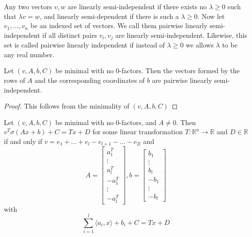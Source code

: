 \documentclass[11pt,letterpaper]{amsart}
\begin{document}
\begin{defin}\label{def:semilinindep}
    Any two vectors $v, w$ are linearly semi-independent if there exists no $\lambda\geq 0$ such that $\lambda v = w$, and linearly semi-dependent if there is such a $\lambda\geq 0$. Now let $v_1, \ldots, v_n$ be an indexed set of vectors. We call them pairwise linearly semi-independent if all distinct pairs $v_i, v_j$ are linearly semi-independent. Likewise, this set is called pairwise linearly independent if instead of $\lambda\geq 0$ we allows $\lambda$ to be any real number. 
\end{defin}
\begin{lemma}
    Let $(v, A, b, C)$ be minimal with no $0$-factors. Then the vectors formed by the rows of $A$ and the corresponding coordinates of $b$ are pairwise linearly semi-independent. 
\end{lemma}
\begin{proof}
    This follows from the minimality of $(v, A, b, C)$
\end{proof}
\begin{proposition}\label{thm:nontrivialzeroparam}
    Let $(v, A, b, C)$ be minimal with no $0$-factors, and $A\neq 0$. Then $v^T\sigma (Ax+b) + C = Tx + D$ for some linear transformation $T:\mathbb{R}^n\rightarrow \mathbb{R}$ and $D\in\mathbb{R}$ if and only if $v = e_1 + \ldots + e_l - e_{l+1} - \ldots - e_{2l}$ and 
    $$
    A = \begin{bmatrix}
        a_1^T\\
        \vdots\\
        a_l^T\\
        -a_{1}^T\\
        \vdots\\
        -a_{l}^T
    \end{bmatrix}, b = \begin{bmatrix}
        b_1\\
        \vdots\\
        b_l\\
        -b_1\\
        \vdots\\
        -b_l
    \end{bmatrix}
    $$
    with
    $$
    \sum_{i=1}^l \langle a_i, x\rangle + b_i + C = Tx + D
    $$
\end{proposition}
\end{document}
